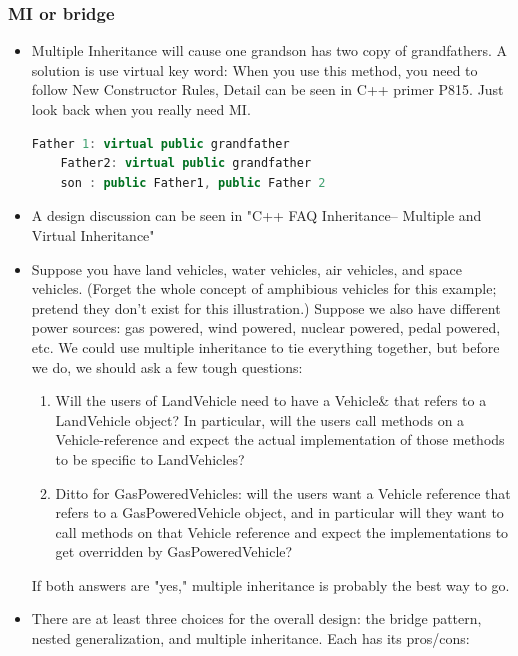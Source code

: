 \documentclass[a4paper,12pt,twoside]{book}
\begin{document}
\subsubsection{MI or bridge}
\begin{itemize}
	\item Multiple Inheritance will cause one grandson has two copy of grandfathers. A solution is use virtual key word: When you use this method, you need to follow New Constructor Rules, Detail can be seen in C++ primer P815.  Just look back when you really need MI.
	\begin{lstlisting}[frame=single, language=c++]
	Father 1: virtual public grandfather
	Father2: virtual public grandfather
	son : public Father1, public Father 2
	\end{lstlisting}
	
	\item A design discussion can be seen in "C++ FAQ Inheritance-- Multiple and Virtual Inheritance"
	\item Suppose you have land vehicles, water vehicles, air vehicles, and space vehicles. (Forget the whole concept of amphibious vehicles for this example; pretend they don't exist for this illustration.) Suppose we also have different power sources: gas powered, wind powered, nuclear powered, pedal powered, etc. We could use multiple inheritance to tie everything together, but before we do, we should ask a few tough questions:
	
	\begin{enumerate}
		\item Will the users of LandVehicle need to have a Vehicle\& that refers to a LandVehicle object? In particular, will the users call methods on a Vehicle-reference and expect the actual implementation of those methods to be specific to LandVehicles?
		
		\item Ditto for GasPoweredVehicles: will the users want a Vehicle reference that refers to a GasPoweredVehicle object, and in particular will they want to call methods on that Vehicle reference and expect the implementations to get overridden by GasPoweredVehicle?
	\end{enumerate}
	If both answers are "yes," multiple inheritance is probably the best way to go.
	
	\item There are at least three choices for the overall design: the bridge pattern, nested generalization, and multiple inheritance. Each has its pros/cons:
	

\end{itemize}
\end{document}

